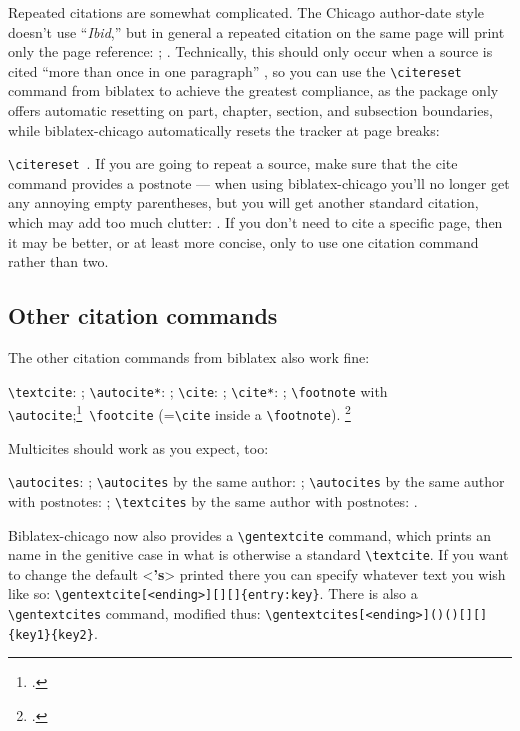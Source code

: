 \documentclass[a4paper,12pt]{report}
\newcommand{\cmd}[1]{\texttt{\textbackslash #1}}
\begin{document}
Repeated citations are somewhat complicated.  The Chicago author-date
style doesn't use \enquote{\emph{Ibid},} but in general a repeated
citation on the same page will print only the page reference:
\autocite{browning:aurora}; \autocite[45]{browning:aurora}.
Technically, this should only occur when a source is cited
\enquote{more than once in one paragraph}
\autocite[15.26]{chicago:manual}, so you can use the \cmd{citereset}
command from \textsf{biblatex} to achieve the greatest compliance, as
the package only offers automatic resetting on part, chapter, section,
and subsection boundaries, while \textsf{biblatex-chicago}
automatically resets the tracker at page breaks:

\citereset\cmd{citereset}\ \autocite[15.27]{chicago:manual}.  If you
are going to repeat a source, make sure that the cite command provides
a postnote --- when using \textsf{biblatex-chicago} you'll no longer
get any annoying empty parentheses, but you will get another standard
citation, which may add too much clutter: \autocite{chicago:manual}.
If you don't need to cite a specific page, then it may be better, or
at least more concise, only to use one citation command rather than
two.

\subsection*{Other citation commands}
\label{sec:other}

The other citation commands from \textsf{biblatex} also work fine:

\cmd{textcite}: \textcite{conley:fifthgrade}; \cmd{autocite*}:
\autocite*{connell:chronic}; \cmd{cite}: \cite{conway:evolution};
\cmd{cite*}: \cite*{davenport:attention}; \cmd{foot\-note} with
\cmd{autocite};\footnote{\autocite{donne:var}.}\ \cmd{footcite}
(=\cmd{cite} inside a \cmd{footnote}).  \footcite{dunn:revolutions}

Multicites should work as you expect, too:

\cmd{autocites}: \autocites{dyna:browser}{eliot:pound};
\cmd{autocites} by the same author:
\autocites{pirumova}{pirumova:russian}; \cmd{autocites} by the same
author with postnotes: \autocites{pirumova}[14]{pirumova:russian};
\cmd{textcites} by the same author with postnotes:
\textcites[37]{pirumova}{pirumova:russian}.

\textsf{Biblatex-chicago} now also provides a \cmd{gentextcite}
command, which prints an  name in the
genitive case in what is otherwise a standard \cmd{textcite}.  If you
want to change the default <\textbf{'s}> printed there you can specify
whatever text you wish like so:
\cmd{gentext\-cite[<ending>][][]\{entry:key\}}.  There is also a
\cmd{gentextcites} command, modified thus:
\cmd{gentextcites[<ending>]()()[][]\{key1\}\{key2\}}.
\end{document}
